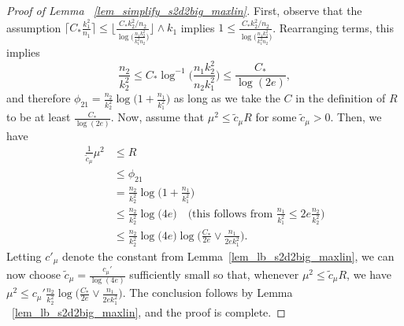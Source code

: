 \documentclass{article}
\newcommand{\Ct}{C_{*}}
\newcommand{\pa}[1]{{\color{red}Parker: #1}}
\begin{document}
\begin{proof}[Proof of Lemma ~\ref{lem_simplify_s2d2big_maxlin}]
    First, observe that the assumption $\lceil \Ct \frac{k_1^2}{n_1}\rceil \leq \big\lfloor \frac{\Ct k_2^2/n_2}{\log\big(\frac{n_1k_2^2}{k_1^2n_2}\big)}\big\rfloor\wedge k_1$ implies 
    $1 \leq \frac{\Ct k_2^2/n_2}{\log\big(\frac{n_1k_2^2}{k_1^2n_2}\big)}$. Rearranging terms, this implies 
    $$\frac{n_2}{k_2^2} \leq \Ct\log^{-1} \big(\frac{n_1k_2^2}{n_2k_1^2}\big) \leq \frac{C_*}{\log(2e)},$$
     and therefore $\phi_{21} = \frac{n_2}{k_2^2}\log\big(1 + \frac{n_1}{k_1^2}\big)$ as long as we take the $C$ in the definition of $R$ to be at least $\frac{C_*}{\log(2e)}$. Now, assume that $\mu^2 \leq \widetilde c_\mu R$ for some $\widetilde c_\mu>0$. Then, we have
        \begin{align*}
            \frac{1}{\widetilde c_\mu}\mu^2 &\leq R \\
            &\leq \phi_{21} \\
            &= \frac{n_2}{k_2^2}\log\big(1 + \frac{n_1}{k_1^2}\big) \\
            &\leq \frac{n_2}{k_2^2}\log\big(4e\big) \quad \text{(this follows from $\frac{n_1}{k_1^2}\leq 2e \frac{n_2}{k_2^2}$)} \\
            &\leq \frac{n_2}{k_2^2}\log\big(4e\big)\log\big(\frac{\Ct}{2e}\vee \frac{n_1}{2ek^2_1}\big).
        \end{align*}
        Letting $c'_\mu$ denote the constant from Lemma~\ref{lem_lb_s2d2big_maxlin}, we can now choose $\widetilde c_\mu = \frac{c_\mu'}{ \log(4e)} $ sufficiently small so that, whenever $\mu^2 \leq \widetilde c_\mu R$, we have $\mu^2 \leq c_\mu' \frac{n_2}{k_2^2}\log\big(\frac{\Ct}{2e}\vee \frac{n_1}{2ek^2_1}\big)$.         
        The conclusion follows by Lemma ~\ref{lem_lb_s2d2big_maxlin}, and the proof is complete. %
\end{proof}
\end{document}
